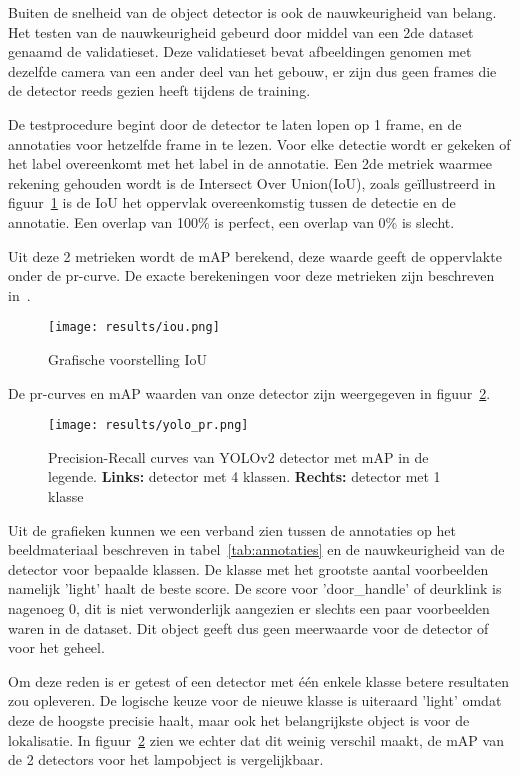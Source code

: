 Buiten de snelheid van de object detector is ook de nauwkeurigheid van belang.
Het testen van de nauwkeurigheid gebeurd door middel van een 2de dataset genaamd de validatieset. Deze validatieset bevat afbeeldingen genomen met dezelfde camera
van een ander deel van het gebouw, er zijn dus geen frames die de detector reeds gezien heeft tijdens de training.

De testprocedure begint door de detector te laten lopen op 1 frame, en de annotaties voor hetzelfde frame in te lezen.
Voor elke detectie wordt er gekeken of het label overeenkomt met het label in de annotatie.
Een 2de metriek waarmee rekening gehouden wordt is de Intersect Over Union(\gls{IoU}), zoals ge\"{i}llustreerd in figuur~\ref{fig:iou} is de \gls{IoU}
het oppervlak overeenkomstig tussen de detectie en de annotatie.
Een overlap van 100\% is perfect, een overlap van 0\% is slecht.

Uit deze 2 metrieken wordt de \gls{mAP} berekend, deze waarde geeft de oppervlakte onder de pr-curve.
De exacte berekeningen voor deze metrieken zijn beschreven in~\cite{everingham2010pascal}.

\begin{figure}[h]
    \centering
    \texttt{[image: results/iou.png]}
    \caption{Grafische voorstelling IoU}
    \label{fig:iou}
\end{figure}

De pr-curves en \gls{mAP} waarden van onze detector zijn weergegeven in figuur~\ref{fig:yolo_pr}.

\begin{figure}[h]
    \texttt{[image: results/yolo\_pr.png]}
    \caption{Precision-Recall curves van YOLOv2 detector met mAP in de legende. \textbf{Links:} detector met 4 klassen. \textbf{Rechts:} detector met 1 klasse}
    \label{fig:yolo_pr}
\end{figure}

Uit de grafieken kunnen we een verband zien tussen de annotaties op het beeldmateriaal beschreven in tabel~\ref{tab:annotaties} en de nauwkeurigheid van
de detector voor bepaalde klassen. De klasse met het grootste aantal voorbeelden namelijk 'light' haalt de beste score.
De score voor 'door\_handle' of deurklink is nagenoeg 0, dit is niet verwonderlijk aangezien er slechts een paar voorbeelden waren in de dataset.
Dit object geeft dus geen meerwaarde voor de detector of voor het geheel.

Om deze reden is er getest of een detector met \'{e}\'{e}n enkele klasse betere resultaten zou opleveren.
De logische keuze voor de nieuwe klasse is uiteraard 'light' omdat deze de hoogste precisie haalt, maar ook het belangrijkste object is voor de lokalisatie.
In figuur~\ref{fig:yolo_pr} zien we echter dat dit weinig verschil maakt, de \gls{mAP} van de 2 detectors voor het lampobject is vergelijkbaar.

